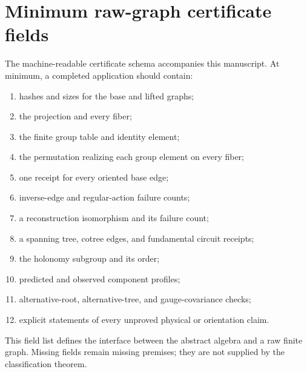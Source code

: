 \section{Minimum raw-graph certificate fields}

The machine-readable certificate schema accompanies this manuscript. At
minimum, a completed application should contain:

\begin{enumerate}
\item hashes and sizes for the base and lifted graphs;
\item the projection and every fiber;
\item the finite group table and identity element;
\item the permutation realizing each group element on every fiber;
\item one receipt for every oriented base edge;
\item inverse-edge and regular-action failure counts;
\item a reconstruction isomorphism and its failure count;
\item a spanning tree, cotree edges, and fundamental circuit receipts;
\item the holonomy subgroup and its order;
\item predicted and observed component profiles;
\item alternative-root, alternative-tree, and gauge-covariance checks;
\item explicit statements of every unproved physical or orientation claim.
\end{enumerate}

This field list defines the interface between the abstract algebra and a raw
finite graph. Missing fields remain missing premises; they are not supplied by
the classification theorem.
